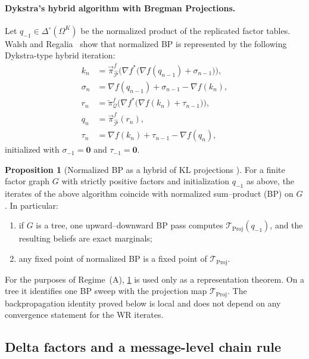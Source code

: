 \documentclass[12pt]{article}
\newcommand{\1}{\mathbb{1}}
\theoremstyle{definition}
\newtheorem{proposition}[theorem]{Proposition}
\newcommand{\Iproj}{\overleftarrow{\pi}}     %
\newcommand{\Rproj}{\overrightarrow{\pi}}    %
\begin{document}
\paragraph{Dykstra’s hybrid algorithm with Bregman Projections.}
Let $q_{-1}\in\Delta^\circ(\Omega^K)$ be the normalized product of the replicated
factor tables. Walsh and Regalia~\cite[Thm.~1]{walsh2010bp} show that normalized
BP is represented by the following Dykstra-type hybrid iteration:
\begin{align*}
k_n
&= \Rproj^f_{\widehat{\mathcal P}}\!\Big(\nabla f^{*}\big(\nabla f(q_{n-1})+\sigma_{n-1}\big)\Big),\\
\sigma_n
&= \nabla f(q_{n-1})+\sigma_{n-1}-\nabla f(k_n),\\
r_n
&= \Iproj^f_{\mathcal Q}\!\Big(\nabla f^{*}\big(\nabla f(k_n)+\tau_{n-1}\big)\Big),\\
q_n
&= \Rproj^f_{\widehat{\mathcal P}}(r_n),\\
\tau_n
&= \nabla f(k_n)+\tau_{n-1}-\nabla f(q_n),
\end{align*}
initialized with $\sigma_{-1}=\mathbf{0}$ and $\tau_{-1}=\mathbf{0}$.

\begin{proposition}[Normalized BP as a hybrid of KL projections {\cite[Thm.~1]{walsh2010bp}}]
\label{prop:WR}
For a finite factor graph $G$ with strictly positive factors and initialization $q_{-1}$ as above, the iterates of the above algorithm coincide with normalized sum--product (BP) on $G$.
In particular:
\begin{enumerate}[label=(\roman*),leftmargin=2em]
\item if $G$ is a tree, one upward--downward BP pass computes $\mathcal{T}_{\mathrm{Proj}}(q_{-1})$, and the resulting beliefs are exact marginals;
\item any fixed point of normalized BP is a fixed point of $\mathcal{T}_{\mathrm{Proj}}$.
\end{enumerate}
\end{proposition}

For the purposes of Regime~(A), \cref{prop:WR} is used only as a representation theorem. On a tree it identifies one BP sweep with the projection map $\mathcal T_{\mathrm{Proj}}$. The backpropagation identity proved below is local and does not depend on any convergence statement for the WR iterates.

\subsection{Delta factors and a message-level chain rule}
\label{subsec:delta-chain}
\end{document}

